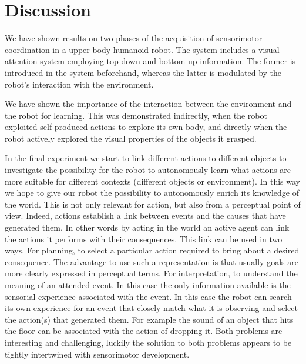 \section{Discussion}
We have shown results on two phases of the acquisition of sensorimotor coordination in a upper body humanoid robot. The system includes a visual attention system employing top-down and bottom-up information. The former is introduced in the system beforehand, whereas the latter is modulated by the robot's interaction with the environment. 

We have shown the importance of the interaction between the environment and the robot for learning. This was demonstrated indirectly, when the robot exploited self-produced actions to explore its own body, and directly when the robot actively explored the visual properties of the objects it grasped.

In the final experiment we start to link different actions to different objects to investigate the possibility for the robot to autonomously learn what actions are more suitable for different contexts (different objects or environment). In this way we hope to give our robot the possibility to autonomously enrich its knowledge of the world. This is not only relevant for action, but also from a perceptual point of view. Indeed, actions establish a link between events and the causes that have generated them. In other words by acting in the world an active agent can link the actions it performs with their consequences. This link can be used in two ways. For planning, to select a particular action required to bring about a desired consequence. The advantage to use such a representation is that usually goals are more clearly expressed in perceptual terms. For interpretation, to understand the meaning of an attended event. In this case the only information available is the sensorial experience associated with the event. In this case the robot can search its own experience for an event that closely match what it is observing and select the action(s) that generated them. For example the sound of an object that hits the floor can be associated with the action of dropping it. Both problems are interesting and challenging, luckily the solution to both problems appears to be tightly intertwined with sensorimotor development.

